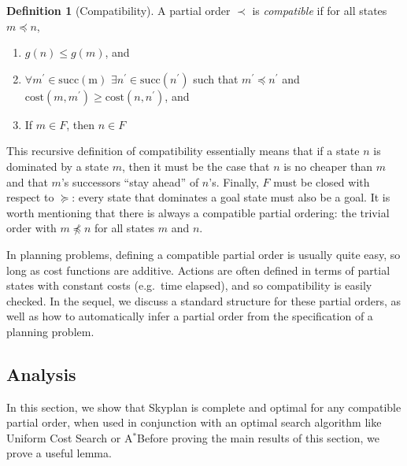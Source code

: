 \documentclass[letterpaper]{article}
\theoremstyle{plain} \newtheorem{theorem}{Theorem} \newtheorem{proposition}{Proposition} \newtheorem{lemma}{Lemma}
\theoremstyle{definition} \newtheorem{definition}{Definition} \newtheorem{conjecture}{Conjecture} \newtheorem*{example}{Example}
\theoremstyle{remark} \newtheorem*{remark}{Remark} \newtheorem*{note}{Note} \newtheorem{case}{Case}
\newcommand{\Astar}{A$^*$}
\begin{document}
\begin{definition}[Compatibility]
	\label{def-compatibility}
  A partial order $\prec$ is \textit{compatible} if for all states $m \preceq n$,
  \begin{enumerate}
    \item $g(n) \le g(m)$, and 
    \item $\forall m^\prime \in \mathrm{succ(m)}$ $\exists n^\prime \in
      \mathrm{succ}(n^\prime)$ such that $m^\prime \preceq n^\prime$ and
      $\mathrm{cost}(m,m^\prime) \ge \mathrm{cost}(n, n^\prime)$, and
    \item If $m \in F$, then $n \in F$
  \end{enumerate}
\end{definition}
This recursive definition of compatibility essentially means that
if a state $n$ is dominated by a state $m$, then it must be the
case that $n$ is no cheaper than $m$ and that $m$'s successors
``stay ahead'' of $n$'s. Finally, $F$ must be closed with respect
to $\succeq$: every state that dominates a goal state must also be
a goal. It is worth mentioning that there is always a compatible
partial ordering: the trivial order with $m \npreceq n$ for all
states $m$ and $n$.

In planning problems, defining a compatible partial order is usually
quite easy, so long as cost functions are additive.  Actions are
often defined in terms of partial states with constant costs (e.g.\
time elapsed), and so compatibility is easily checked.  In the
sequel, we discuss a standard structure for these partial orders,
as well as how to automatically infer a partial order from the
specification of a planning problem.

\subsection{Analysis}

In this section, we show that Skyplan is complete and optimal for 
any compatible partial order, when used in conjunction with an optimal
search algorithm like Uniform Cost Search or \Astar Before proving the main results of this section, we prove a useful lemma. 
\end{document}
